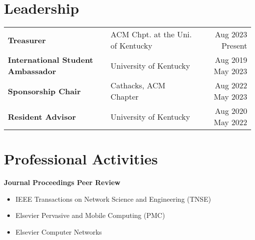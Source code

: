 \documentclass[a4paper,12pt]{article}
\begin{document}
\section{Leadership}
\begin{tabularx}{\linewidth}{@{}l X r@{}}
\textbf{Treasurer} & ACM Chpt. at the Uni. of Kentucky & Aug 2023 Present \\ %
\textbf{International Student Ambassador} & University of Kentucky & Aug 2019 May 2023 \\ %
\textbf{Sponsorship Chair} & Cathacks, ACM Chapter & Aug 2022 May 2023 \\ %
\textbf{Resident Advisor} & University of Kentucky & Aug 2020 May 2022 \\ %
\end{tabularx}




\section{Professional Activities}

\textbf{Journal Proceedings Peer Review}
\begin{itemize}[nosep,after=\strut, leftmargin=1em, itemsep=3pt,label=--]
\item IEEE Transactions on Network Science and Engineering (TNSE)
\item Elsevier Pervasive and Mobile Computing (PMC)
\item Elsevier Computer Networks
\end{itemize}
\end{document}
